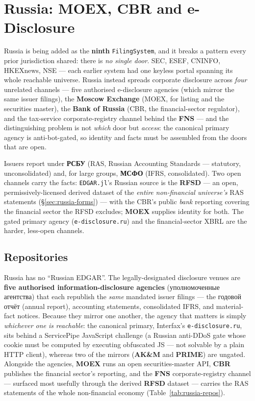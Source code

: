 \documentclass[11pt,a4paper]{report}
\newcommand{\rus}[1]{{\rusfont #1}}
\begin{document}
\chapter{Russia: MOEX, CBR and e-Disclosure}
\label{sys:russia}

Russia is being added as the \textbf{ninth} \texttt{FilingSystem}, and it breaks a pattern every prior
jurisdiction shared: there is \emph{no single door}. SEC, ESEF, CNINFO, HKEXnews, NSE --- each earlier system
had one keyless portal spanning its whole reachable universe. Russia instead spreads corporate disclosure
across \emph{four} unrelated channels --- five authorised e-disclosure agencies (which mirror the same
issuer filings), the \textbf{Moscow Exchange} (MOEX, for listing and the securities master), the \textbf{Bank
of Russia} (CBR, the financial-sector regulator), and the tax-service corporate-registry channel behind the
\textbf{FNS} --- and the distinguishing problem is not \emph{which} door but \emph{access}: the canonical
primary agency is anti-bot-gated, so identity and facts must be assembled from the doors that are open.

Issuers report under \textbf{\rus{РСБУ}} (RAS, Russian Accounting Standards --- statutory, unconsolidated)
and, for large groups, \textbf{\rus{МСФО}} (IFRS, consolidated). Two open channels carry the facts:
\texttt{EDGAR.jl}'s Russian source is the \textbf{RFSD} --- an open, permissively-licensed derived dataset of
the \emph{entire non-financial universe's} RAS statements (\S\ref{sec:russia-forms}) --- with the CBR's public
\emph{bank} reporting covering the financial sector the RFSD excludes; \textbf{MOEX} supplies identity for
both. The gated primary agency (\texttt{e-disclosure.ru}) and the financial-sector XBRL are the harder,
less-open channels.

\section{Repositories}\label{sec:russia-repos}

Russia has no ``Russian EDGAR''. The legally-designated disclosure venues are \textbf{five authorised
information-disclosure agencies} (\rus{уполномоченные агентства}) that each republish the \emph{same}
mandated issuer filings --- the \rus{годовой отчёт} (annual report), accounting statements, consolidated
IFRS, and material-fact notices. Because they mirror one another, the agency that matters is simply
\emph{whichever one is reachable}: the canonical primary, Interfax's \texttt{e-disclosure.ru}, sits behind a
ServicePipe JavaScript challenge (a Russian anti-DDoS gate whose cookie must be computed by executing
obfuscated JS --- not solvable by a plain HTTP client), whereas two of the mirrors (\textbf{AK\&M} and
\textbf{PRIME}) are ungated. Alongside the agencies, \textbf{MOEX} runs an open securities-master API,
\textbf{CBR} publishes the financial sector's reporting, and the \textbf{FNS} corporate-registry channel ---
surfaced most usefully through the derived \textbf{RFSD} dataset --- carries the RAS statements of the whole
non-financial economy (Table~\ref{tab:russia-repos}).
\end{document}
